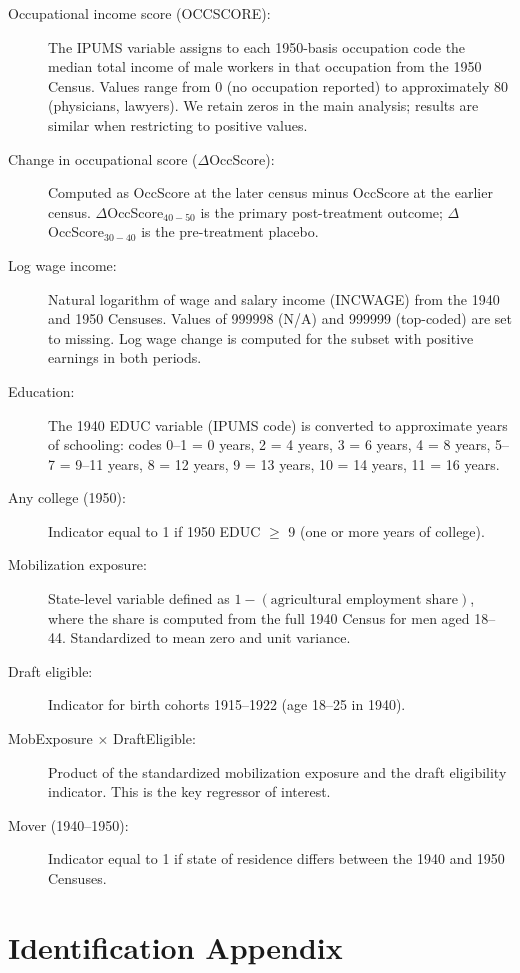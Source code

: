 \documentclass[12pt]{article}
\begin{document}
\begin{description}
\item[Occupational income score (OCCSCORE):] The IPUMS variable assigns to each 1950-basis occupation code the median total income of male workers in that occupation from the 1950 Census. Values range from 0 (no occupation reported) to approximately 80 (physicians, lawyers). We retain zeros in the main analysis; results are similar when restricting to positive values.
\item[Change in occupational score ($\Delta$OccScore):] Computed as OccScore at the later census minus OccScore at the earlier census. $\Delta$OccScore$_{40-50}$ is the primary post-treatment outcome; $\Delta$OccScore$_{30-40}$ is the pre-treatment placebo.
\item[Log wage income:] Natural logarithm of wage and salary income (INCWAGE) from the 1940 and 1950 Censuses. Values of 999998 (N/A) and 999999 (top-coded) are set to missing. Log wage change is computed for the subset with positive earnings in both periods.
\item[Education:] The 1940 EDUC variable (IPUMS code) is converted to approximate years of schooling: codes 0--1 = 0 years, 2 = 4 years, 3 = 6 years, 4 = 8 years, 5--7 = 9--11 years, 8 = 12 years, 9 = 13 years, 10 = 14 years, 11 = 16 years.
\item[Any college (1950):] Indicator equal to 1 if 1950 EDUC $\geq$ 9 (one or more years of college).
\item[Mobilization exposure:] State-level variable defined as $1 - (\text{agricultural employment share})$, where the share is computed from the full 1940 Census for men aged 18--44. Standardized to mean zero and unit variance.
\item[Draft eligible:] Indicator for birth cohorts 1915--1922 (age 18--25 in 1940).
\item[MobExposure $\times$ DraftEligible:] Product of the standardized mobilization exposure and the draft eligibility indicator. This is the key regressor of interest.
\item[Mover (1940--1950):] Indicator equal to 1 if state of residence differs between the 1940 and 1950 Censuses.
\end{description}

\section{Identification Appendix}
\label{app:identification}
\end{document}
